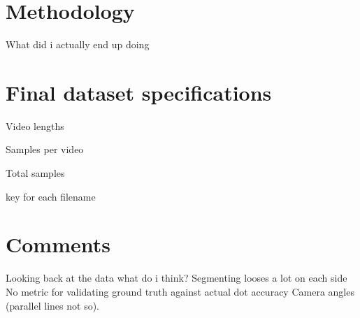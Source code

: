 \section{Methodology}
What did i actually end up doing

\section{Final dataset specifications}
Video lengths

Samples per video

Total samples

key for each filename


\section{Comments}
Looking back at the data what do i think?
Segmenting looses a lot on each side
No metric for validating ground truth against actual dot accuracy
Camera angles (parallel lines not so).




